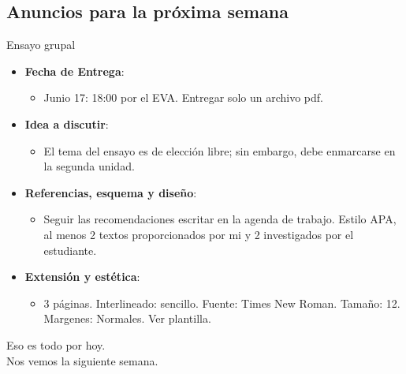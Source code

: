 \documentclass[11pt, aspectratio=169, compress]{beamer}
\makeatletter
\def\beamer@writeslidentry@miniframesoff{%
	\expandafter\beamer@ifempty\expandafter{\beamer@framestartpage}{}%
	{%
		\clearpage\beamer@notesactions%
	}
}
\newcommand*{\miniframesoff}{\let\beamer@writeslidentry=\beamer@writeslidentry@miniframesoff}
\makeatother
\begin{document}
\subsection*{Anuncios para la próxima semana}
\begin{frame}{Ensayo grupal}
\begin{itemize}
	\item \textbf{Fecha de Entrega}: 
	\begin{itemize}
		\item Junio 17: 18:00 por el EVA. Entregar solo un archivo pdf. 
	\end{itemize}
	\item \textbf{Idea a discutir}: 
	\begin{itemize}
		\item El tema del ensayo es de elección libre; sin embargo, debe enmarcarse en la segunda unidad.
	\end{itemize}
	\item \textbf{Referencias, esquema y diseño}: 
	\begin{itemize}
		\item Seguir las recomendaciones escritar en la agenda de trabajo. Estilo APA, al menos 2 textos proporcionados por
		mi y 2 investigados por el estudiante. 
	\end{itemize}
	\item \textbf{Extensión y estética}: 
	\begin{itemize}
		\item 3 páginas. Interlineado: sencillo. Fuente: Times New Roman. Tamaño: 12. Margenes: Normales. Ver plantilla. 
	\end{itemize}
\end{itemize}
\end{frame}
\miniframesoff 	
\begin{frame}
Eso es todo por hoy. \\ 
Nos vemos la siguiente semana. 
\end{frame}
\end{document}
